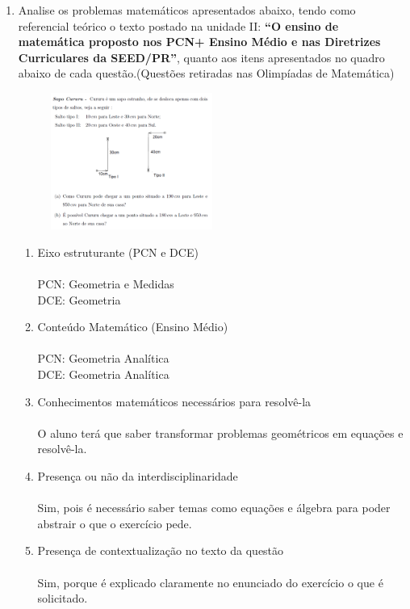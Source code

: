 \documentclass[a4paper, 12pt]{article}
\begin{document}
\begin{enumerate}
\item Analise os problemas matemáticos apresentados abaixo, tendo como referencial teórico o texto postado na unidade II: \textbf{“O ensino de matemática proposto nos PCN+ Ensino Médio e nas Diretrizes Curriculares da SEED/PR”}, quanto aos itens apresentados no quadro abaixo de cada questão.(Questões retiradas nas Olimpíadas de Matemática)
\begin{figure}[h!]
  \centering
  \includegraphics[width=0.5\textwidth]{1}
\end{figure} 
  \begin{enumerate}
  \item Eixo estruturante (PCN e DCE)\\\\
    PCN: Geometria e Medidas\\
    DCE: Geometria
  \item Conteúdo Matemático (Ensino Médio) \\\\
    PCN: Geometria Analítica\\
    DCE: Geometria Analítica
  \item Conhecimentos matemáticos necessários para resolvê-la \\\\
    O aluno terá que saber transformar problemas geométricos em equações e resolvê-la.
  \item Presença ou não da interdisciplinaridade \\\\
    Sim, pois é necessário saber temas como equações e álgebra para poder abstrair o que o exercício pede.
  \item Presença de contextualização no texto da questão\\\\
    Sim, porque é explicado claramente no enunciado do exercício o que é solicitado.
  \end{enumerate}


\end{enumerate}
\end{document}
